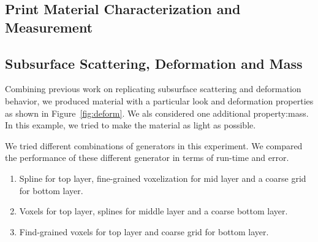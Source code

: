 \documentclass[annual]{acmsiggraph}
\begin{document}
\subsection{Print Material Characterization and Measurement}
\subsection{Subsurface Scattering, Deformation and Mass}
Combining previous work on replicating
subsurface scattering and deformation behavior, 
we produced
material with a particular
look and deformation properties as shown in Figure~\ref{fig:deform}.
We als considered one additional property:mass. 
In this example, we
tried to make the material as light as possible.

We tried different combinations of generators in this experiment.
We compared the performance of these different generator
in terms of run-time and error.
\begin{enumerate}
\item Spline for top layer, fine-grained voxelization for mid layer
and a coarse grid for bottom layer.
\item Voxels for top layer, splines for middle layer and a coarse
bottom layer.
\item Find-grained voxels for top layer and coarse grid for bottom layer.
\end{enumerate}
\end{document}
